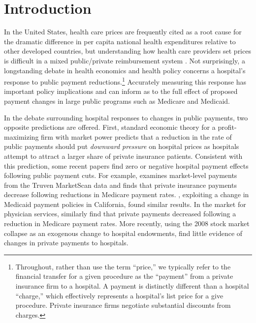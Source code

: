 \documentclass[12pt]{article}
\begin{document}
\newpage
\section{Introduction}
\onehalfspacing

In the United States, health care prices are frequently cited as a root cause for the dramatic difference in per capita national health expenditures relative to other developed countries, but understanding how health care providers set prices is difficult in a mixed public/private reimbursement system \citep{anderson2003}.  Not surprisingly, a longstanding debate in health economics and health policy concerns a hospital's response to public payment reductions.\footnote{Throughout, rather than use the term ``price,'' we typically refer to the financial transfer for a given procedure as the ``payment'' from a private insurance firm to a hospital. A payment is distinctly different than a hospital ``charge,'' which effectively represents a hospital's list price for a give procedure. Private insurance firms negotiate substantial discounts from charges.} Accurately measuring this response has important policy implications and can inform as to the full effect of proposed payment changes in large public programs such as Medicare and Medicaid.

In the debate surrounding hospital responses to changes in public payments, two opposite predictions are offered. First, standard economic theory for a profit-maximizing firm with market power predicts that a reduction in the rate of public payments should put \textit{downward pressure} on hospital prices as hospitals attempt to attract a larger share of private insurance patients. Consistent with this prediction, some recent papers find zero or negative hospital payment effects following public payment cuts. For example, \cite{white2013} examines market-level payments from the Truven MarketScan data and finds that private insurance payments decrease following reductions in Medicare payment rates. \citet{dranove1998}, exploiting a change in Medicaid payment policies in California, found similar results. In the market for physician services, \cite{clemens2017} similarly find that private payments decreased following a reduction in Medicare payment rates. More recently, using the 2008 stock market collapse as an exogenous change to hospital endowments, \cite{dranove2017} find little evidence of changes in private payments to hospitals.
\end{document}
